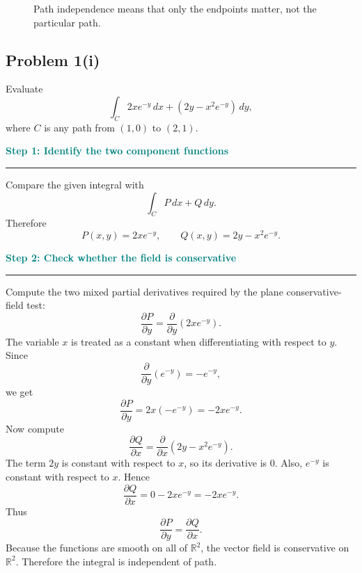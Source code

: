 \documentclass[11pt,a4paper]{article}
\newenvironment{reasonbox}[1]{%
  \par\medskip
  \noindent\textcolor{teal}{\bfseries #1}\par
  \noindent\textcolor{teal}{\rule{0.72\linewidth}{0.45pt}}\par\smallskip
}{\par\medskip}
\newcommand{\R}{\mathbb{R}}
\newcommand{\pd}[2]{\frac{\partial #1}{\partial #2}}
\begin{document}
\begin{figure}[H]
\centering
{}
\caption{Path independence means that only the endpoints matter, not the particular path.}
\end{figure}

\subsection{Problem 1(i)}
Evaluate
\[
\int_C 2xe^{-y}\,dx+\left(2y-x^2e^{-y}\right)\,dy,
\]
where \(C\) is any path from \((1,0)\) to \((2,1)\).

\begin{reasonbox}{Step 1: Identify the two component functions}
Compare the given integral with
\[
\int_C P\,dx+Q\,dy.
\]
Therefore
\[
P(x,y)=2xe^{-y},\qquad Q(x,y)=2y-x^2e^{-y}.
\]
\end{reasonbox}

\begin{reasonbox}{Step 2: Check whether the field is conservative}
Compute the two mixed partial derivatives required by the plane conservative-field test:
\[
\pd{P}{y}=\pd{}{y}\left(2xe^{-y}\right).
\]
The variable \(x\) is treated as a constant when differentiating with respect to \(y\). Since
\[
\pd{}{y}\left(e^{-y}\right)=-e^{-y},
\]
we get
\[
\pd{P}{y}=2x(-e^{-y})=-2xe^{-y}.
\]
Now compute
\[
\pd{Q}{x}=\pd{}{x}\left(2y-x^2e^{-y}\right).
\]
The term \(2y\) is constant with respect to \(x\), so its derivative is \(0\).  Also, \(e^{-y}\) is constant with respect to \(x\).  Hence
\[
\pd{Q}{x}=0-2xe^{-y}=-2xe^{-y}.
\]
Thus
\[
\pd{P}{y}=\pd{Q}{x}.
\]
Because the functions are smooth on all of \(\R^2\), the vector field is conservative on \(\R^2\).  Therefore the integral is independent of path.
\end{reasonbox}
\end{document}
